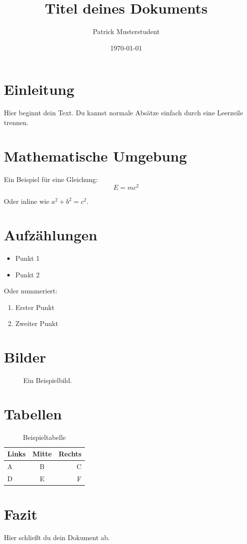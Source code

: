 \documentclass[a4paper,12pt]{article} %
\title{Titel deines Dokuments}
\author{Patrick Musterstudent}
\date{\today}
\begin{document}

\maketitle %

\tableofcontents %
\newpage

\section{Einleitung}
Hier beginnt dein Text. Du kannst normale Absätze einfach durch eine Leerzeile trennen.

\section{Mathematische Umgebung}
Ein Beispiel für eine Gleichung:
\begin{equation}
E = mc^2
\end{equation}

Oder inline wie \( a^2 + b^2 = c^2 \).

\section{Aufzählungen}
\begin{itemize}
    \item Punkt 1
    \item Punkt 2
\end{itemize}

Oder nummeriert:
\begin{enumerate}
    \item Erster Punkt
    \item Zweiter Punkt
\end{enumerate}

\section{Bilder}
\begin{figure}[h!]
    \centering
    \caption{Ein Beispielbild.}
    \label{fig:beispiel}
\end{figure}

\section{Tabellen}
\begin{table}[h!]
    \centering
    \begin{tabular}{l c r}
        \toprule
        Links & Mitte & Rechts \\
        \midrule
        A & B & C \\
        D & E & F \\
        \bottomrule
    \end{tabular}
    \caption{Beispieltabelle}
    \label{tab:beispiel}
\end{table}

\section{Fazit}
Hier schließt du dein Dokument ab.

\end{document}
